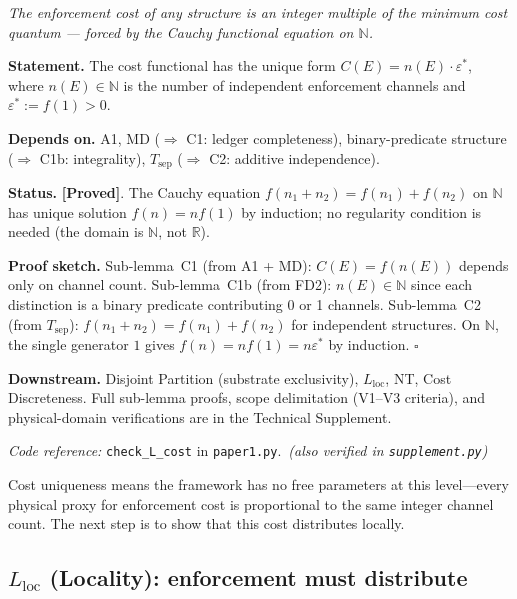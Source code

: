 \documentclass[11pt]{article}
\theoremstyle{remark}
\newcommand{\coderef}[2]{\smallskip\noindent\textit{Code reference:} \texttt{#1} in \texttt{#2}.}
\begin{document}
\begin{tcolorbox}[apfbox, title={$L_{\mathrm{cost}}$: Cost Functional Form Uniqueness}]
\textit{The enforcement cost of any structure is an integer multiple of the minimum cost quantum --- forced by the Cauchy functional equation on $\mathbb{N}$.}

\smallskip\noindent\textbf{Statement.}  The cost functional has the unique form $C(E) = n(E) \cdot \varepsilon^*$, where $n(E) \in \mathbb{N}$ is the number of independent enforcement channels and $\varepsilon^* := f(1) > 0$.

\smallskip\noindent\textbf{Depends on.}  A1, MD ($\Rightarrow$ C1: ledger completeness), binary-predicate structure ($\Rightarrow$ C1b: integrality), $T_{\mathrm{sep}}$ ($\Rightarrow$ C2: additive independence).

\smallskip\noindent\textbf{Status.}  \textbf{[Proved]}.  The Cauchy equation $f(n_1 + n_2) = f(n_1) + f(n_2)$ on $\mathbb{N}$ has unique solution $f(n) = nf(1)$ by induction; no regularity condition is needed (the domain is $\mathbb{N}$, not $\mathbb{R}$).

\smallskip\noindent\textbf{Proof sketch.}  Sub-lemma~C1 (from A1 + MD): $C(E) = f(n(E))$ depends only on channel count.  Sub-lemma~C1b (from FD2): $n(E) \in \mathbb{N}$ since each distinction is a binary predicate contributing 0 or 1 channels.  Sub-lemma~C2 (from $T_{\mathrm{sep}}$): $f(n_1 + n_2) = f(n_1) + f(n_2)$ for independent structures.  On $\mathbb{N}$, the single generator $1$ gives $f(n) = nf(1) = n\varepsilon^*$ by induction.  \hfill$\square$

\smallskip\noindent\textbf{Downstream.}  Disjoint Partition (substrate exclusivity), $L_{\mathrm{loc}}$, NT, Cost Discreteness.  Full sub-lemma proofs, scope delimitation (V1--V3 criteria), and physical-domain verifications are in the Technical Supplement.

\coderef{check\_L\_cost}{paper1.py}\,%
\hspace{1em}\textit{(also verified in \texttt{supplement.py})}
\end{tcolorbox}

\smallskip\noindent Cost uniqueness means the framework has no free parameters at this level---every physical proxy for enforcement cost is proportional to the same integer channel count.  The next step is to show that this cost distributes locally.

\subsection{\texorpdfstring{$L_{\mathrm{loc}}$}{L loc} (Locality): enforcement must distribute}
\label{sec:L_loc}
\end{document}
